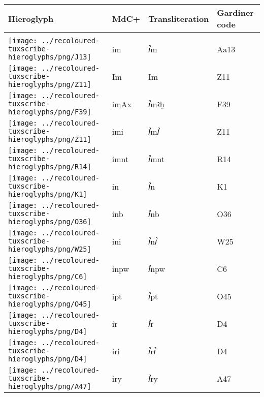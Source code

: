 \begin{center}
	\begin{tabularx}{\linewidth}{YYYY}
		Hieroglyph & MdC+ & Transliteration & Gardiner code\\
		\hline\\
		\texttt{[image: ../recoloured-tuxscribe-hieroglyphs/png/J13]} & im & ꞽm & Aa13 \\ 
		\texttt{[image: ../recoloured-tuxscribe-hieroglyphs/png/Z11]} & Im & Im & Z11 \\ 
		\texttt{[image: ../recoloured-tuxscribe-hieroglyphs/png/F39]} & imAx & ꞽmꜣḫ & F39 \\ 
		\texttt{[image: ../recoloured-tuxscribe-hieroglyphs/png/Z11]} & imi & ꞽmꞽ & Z11 \\ 
		\texttt{[image: ../recoloured-tuxscribe-hieroglyphs/png/R14]} & imnt & ꞽmnt & R14 \\ 
		\texttt{[image: ../recoloured-tuxscribe-hieroglyphs/png/K1]} & in & ꞽn & K1 \\ 
		\texttt{[image: ../recoloured-tuxscribe-hieroglyphs/png/O36]} & inb & ꞽnb & O36 \\ 
		\texttt{[image: ../recoloured-tuxscribe-hieroglyphs/png/W25]} & ini & ꞽnꞽ & W25 \\ 
		\texttt{[image: ../recoloured-tuxscribe-hieroglyphs/png/C6]} & inpw & ꞽnpw & C6 \\ 
		\texttt{[image: ../recoloured-tuxscribe-hieroglyphs/png/O45]} & ipt & ꞽpt & O45 \\ 
		\vspace{0.06250cm} \texttt{[image: ../recoloured-tuxscribe-hieroglyphs/png/D4]} \vspace{0.06250cm} & ir & ꞽr & D4 \\ 
		\vspace{0.06250cm} \texttt{[image: ../recoloured-tuxscribe-hieroglyphs/png/D4]} \vspace{0.06250cm} & iri & ꞽrꞽ & D4 \\ 
		\texttt{[image: ../recoloured-tuxscribe-hieroglyphs/png/A47]} & iry & ꞽry & A47 \\ 
	\end{tabularx}
\end{center}


